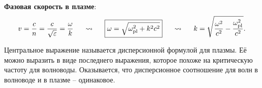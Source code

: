 \textbf{Фазовая скорость в плазме}:
\begin{equation}
	v = \frac{c}{n} = \frac{c}{\sqrt{\varepsilon}}= \frac{\omega}{k} \hspace*{0.5 cm} \leadsto \hspace*{0.5 cm} \boxed{\omega = \sqrt{\omega_\text{pl}^2 + k^2 c^2}} \hspace*{0.5 cm} \leadsto \hspace*{0.5 cm} k = \sqrt{\frac{\omega^2}{c^2} - \frac{\omega^2_\text{pl}}{c^2 }}.
\end{equation}


Центральное выражение называется дисперсионной формулой для плазмы. Её можно выразить в виде последнего выражения, которое похоже на критическую частоту для волноводы. Оказывается, что дисперсионное соотношение для волн в волноводе и в плазме -- одинаковое.